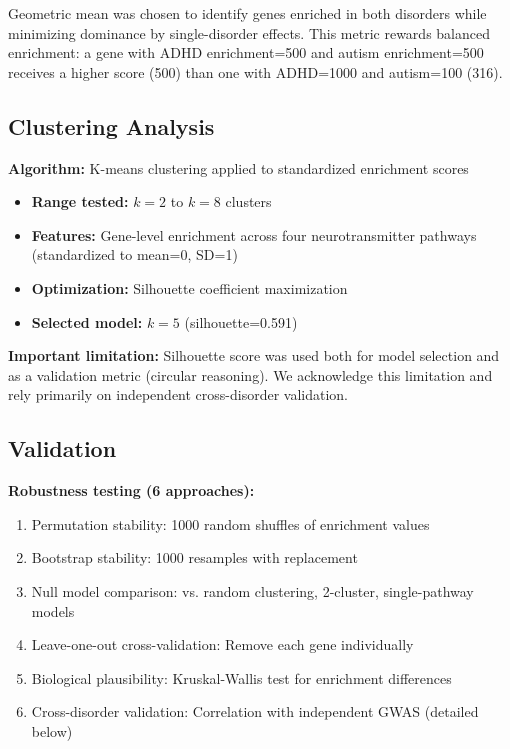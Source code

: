 \documentclass[12pt,letterpaper]{article}
\theoremstyle{definition}
\theoremstyle{remark}
\begin{document}
Geometric mean was chosen to identify genes enriched in both disorders while minimizing dominance by single-disorder effects. This metric rewards balanced enrichment: a gene with ADHD enrichment=500 and autism enrichment=500 receives a higher score (500) than one with ADHD=1000 and autism=100 (316).

\subsection{Clustering Analysis}

\textbf{Algorithm:} K-means clustering applied to standardized enrichment scores
\begin{itemize}
    \item \textbf{Range tested:} $k=2$ to $k=8$ clusters
    \item \textbf{Features:} Gene-level enrichment across four neurotransmitter pathways (standardized to mean=0, SD=1)
    \item \textbf{Optimization:} Silhouette coefficient maximization
    \item \textbf{Selected model:} $k=5$ (silhouette=0.591)
\end{itemize}

\textbf{Important limitation:} Silhouette score was used both for model selection and as a validation metric (circular reasoning). We acknowledge this limitation and rely primarily on independent cross-disorder validation.

\subsection{Validation}

\textbf{Robustness testing (6 approaches):}
\begin{enumerate}
    \item Permutation stability: 1000 random shuffles of enrichment values
    \item Bootstrap stability: 1000 resamples with replacement
    \item Null model comparison: vs. random clustering, 2-cluster, single-pathway models
    \item Leave-one-out cross-validation: Remove each gene individually
    \item Biological plausibility: Kruskal-Wallis test for enrichment differences
    \item Cross-disorder validation: Correlation with independent GWAS (detailed below)
\end{enumerate}
\end{document}
